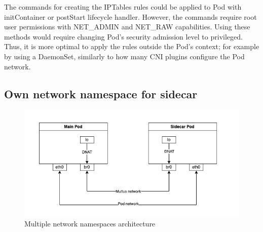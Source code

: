 \documentclass[english, 12pt, a4paper, sci, utf8, a-2b, online]{aaltothesis}
\begin{document}
The commands for creating the IPTables rules could be applied to Pod with initContainer or postStart lifecycle handler. However, the commands require root user permissions with NET\_ADMIN and NET\_RAW capabilities. Using these methods would require changing Pod's security admission level to privileged. Thus, it is more optimal to apply the rules outside the Pod's context; for example by using a DaemonSet, similarly to how many CNI plugins configure the Pod network.

\subsection{Own network namespace for sidecar}





\begin{figure}[h!]
  \centering
  \includegraphics[width=\linewidth]{files/multus.png}
  \caption{Multiple network namespaces architecture}
  \label{fig:multi-pod-net-solution}
\end{figure}
\end{document}
